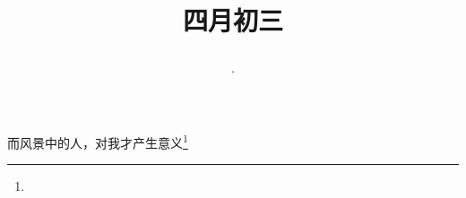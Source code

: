 \title{\date[d=10,m=5,y=2024][year:cn-y,年,month:cn,day:cn,日,·,weekday]·四月初三 }
而风景中的人，对我才产生意义\footnote{ }

